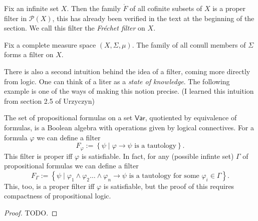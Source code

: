 \begin{example}
    Fix an infinite set \( X \). Then the family \( \acute F \) of all cofinite subsets of \( X \) is a proper filter in \( \mathcal{P}(X) \), this has already been verified in the text at the beginning of the section. We call this filter the \emph{Fréchet filter} on \( X \).
\end{example}

\begin{example}
    Fix a complete measure space \( (X, \Sigma, \mu) \). The family of all conull members of \( \Sigma \) forms a filter on \( X \).
\end{example}

There is also a second intuition behind the idea of a filter, coming more directly from logic. One can think of a liter as a \emph{state of knowledge}. The following example is one of the ways of making this notion precise. (I learned this intuition from section 2.5 of Urzyczyn)

\begin{example}
    The set of propositional formulas on a set \( \mathsf{Var} \), quotiented by equivalence of formulas, is a Boolean algebra with operations given by logical connectives. For a formula \( \varphi \) we can define a filter
    \[ 
        F_\varphi := \left\{ \psi \mid \varphi \to \psi \text{ is a tautology} \right\}. 
   \]
   This filter is proper iff \( \varphi \) is satisfiable. In fact, for any (possible infinte set) \( \Gamma \) of propositional formulas we can define a filter
   \[ 
       F_\Gamma := \left\{ \psi \mid \varphi_1 \wedge \varphi_2 \ldots \wedge \varphi_n \to \psi \text{ is a tautology for some } \varphi_i \in \Gamma \right\}. 
  \]
  This, too, is a proper filter iff \( \varphi \) is satisfiable, but the proof of this requires compactness of propositional logic.
\end{example}



\begin{proof}
TODO.
\end{proof}

